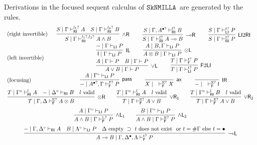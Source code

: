 \documentclass[submission,copyright,creativecommons]{eptcs}
\theoremstyle{definition}
\newcommand{\tl}{\otimes \mathsf{L}}
\newcommand{\tr}{\otimes \mathsf{R}}
\newcommand{\lright}{{\multimap}\mathsf{R}}
\newcommand{\lleft}{{\multimap}\mathsf{L}}
\newcommand{\pass}{\mathsf{pass}}
\newcommand{\unitl}{\mathsf{IL}}
\newcommand{\unitr}{\mathsf{IR}}
\newcommand{\andlone}{\land \mathsf{L_{1}}}
\newcommand{\andltwo}{\land \mathsf{L_{2}}}
\newcommand{\andr}{\land \mathsf{R}}
\newcommand{\orl}{\lor \mathsf{L}}
\newcommand{\orrone}{\lor \mathsf{R_{1}}}
\newcommand{\orrtwo}{\lor \mathsf{R_{2}}}
\newcommand{\ax}{\mathsf{ax}}
\newcommand{\ot}{\otimes}
\newcommand{\lolli}{\multimap}
\newcommand{\I}{\mathsf{I}}
\newcommand{\RI}{\mathsf{RI}}
\newcommand{\LI}{\mathsf{LI}}
\newcommand{\F}{\mathsf{F}}
\newcommand{\tP}{\mathbb{P}}
\newcommand{\tL}{\mathbb{L}}
\newcommand{\tR}{\mathbb{R}}
\newcommand{\tE}{\mathbb{E}}
\newcommand{\proofbox}[1]{\begin{tabular}{l} #1 \end{tabular}}
\newcommand{\SkNMILLA}{$\mathtt{SkNMILLA}$}
\begin{document}
Derivations in the focused sequent calculus of \SkNMILLA \ are generated by the rules.
\begin{equation}\label{eq:focus:impl}
  \begin{array}{lc}
    \text{(right invertible)} & %
    \proofbox{
      \infer[\andr]{S \mid \Gamma \vdash^{l_1?, l_2?}_{\RI} A \land B}{
        S \mid \Gamma \vdash^{l_1?}_{\RI} A
        &
        S \mid \Gamma \vdash^{l_2?}_{\RI} B
      }
    \qquad
    \infer[\lright]{S \mid \Gamma \vdash^{l?}_{\RI} A \lolli B}{S \mid \Gamma , A^{\bullet ?} \vdash^{l?}_{\RI} B}
    \qquad
    \infer[\LI 2 \RI]{S \mid \Gamma \vdash^{t?}_{\RI} P}{S \mid \Gamma \vdash^{t?}_{\LI} P}
    }
    \\[10pt]
    \text{(left invertible)} & %
    \proofbox{
      \infer[\unitl]{\I \mid \Gamma \vdash_{\LI} P}{{-} \mid \Gamma \vdash_{\LI} P}
    \qquad
    \infer[\tl]{A \ot B \mid \Gamma \vdash_{\LI} P}{A \mid B , \Gamma \vdash_{\LI} P}
    \\
    \infer[\orl]{A \lor B \mid \Gamma \vdash P}{
      A \mid \Gamma \vdash P
      &
      B \mid \Gamma \vdash P
    }
    \qquad
    \infer[\F 2 \LI]{T \mid \Gamma \vdash^{t?}_{\LI} P}{T \mid \Gamma \vdash^{t?}_{\F} P}
    }
    \\[10pt]
    \text{(focusing)} &    %
    \proofbox{
    \infer[\pass]{{-} \mid A^{\bullet ?} , \Gamma \vdash^{\tP?}_{\F} P }{
        A \mid \Gamma^{\circ} \vdash_{\LI} P
    }
    \qquad
    \infer[\ax]{X \mid \quad \vdash^{\tE?}_{\F} X}{}
    \qquad
    \infer[\unitr]{{-} \mid \quad \vdash^{\tE?}_{\F} \I}{}
    }
    \\[10pt]
    \multicolumn{2}{c}{
    \infer[\tr]{T \mid \Gamma , \Delta \vdash^{\tE?}_{\F} A \ot B}{
      T \mid \Gamma^{\circ} \vdash^{l}_{\RI} A
      &
      {-} \mid \Delta^{\circ} \vdash_{\RI} B
      &
      l \ \text{valid}
    }
    \qquad
    \infer[\orrone]{T \mid \Gamma \vdash^{\tE?}_{\F} A \lor B}{
      T \mid \Gamma^{\circ} \vdash^{l}_{\RI} A
      &
      l \ \text{valid}
    }
    \qquad
    \infer[\orrtwo]{T \mid \Gamma \vdash^{\tE?}_{\F} A \lor B}{
      T \mid \Gamma^{\circ} \vdash^{l}_{\RI} B
      &
      l \ \text{valid}
    }
    }
    \\[6pt]
    \multicolumn{2}{c}{
    \infer[\andlone]{A \land B \mid \Gamma \vdash^{\tL?}_{\F} P}{A \mid \Gamma^{\circ} \vdash_{\LI} P}
    \qquad
    \infer[\andltwo]{A \land B \mid \Gamma \vdash^{\tR?}_{\F} P}{B \mid \Gamma^{\circ} \vdash_{\LI} P}
    }
    \\[6pt]
    \multicolumn{2}{c}{
      \infer[\lleft]{A \lolli B \mid \Gamma , \Delta^{\bullet} , \Lambda \vdash^{t?}_{\F} P}{
        - \mid \Gamma , \Delta^{\circ} \vdash_{\RI} A
        &
        B \mid \Lambda^{\circ} \vdash_{\LI} P
        &
        \Delta \text{ empty } \supset \ t \text{ does not exist } \text{ or } t = \# \Gamma  \text{ else }  t = \bullet 
      }
    }
  \end{array}
\end{equation}
\end{document}
